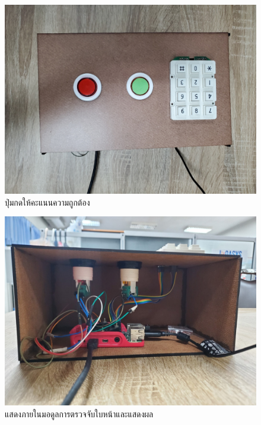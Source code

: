 
\begin{figure}[!ht]
  \begin{center}
    \includegraphics[scale=.17]{pic/rpi_top.jpg}
    \caption[button]{ปุ่มกดให้คะแนนความถูกต้อง}
    \label{fig:button_module}
  \end{center}
\end{figure}

\begin{figure}[!ht]
  \begin{center}
    \includegraphics[scale=.17]{pic/rpi_back.jpg}
    \caption[inside module]{แสดงภายในมอดูลการตรวจจับใบหน้าและแสดงผล}
    \label{fig:inside_module}
  \end{center}
\end{figure}

